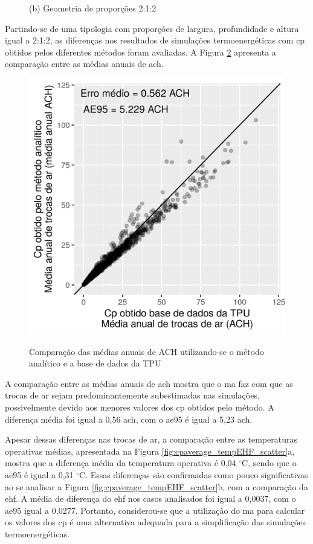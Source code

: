 \documentclass[brazil,hardcopy,openany]{ufscthesis} %
\begin{document}
\begin{figure}[h]
\begin{minipage}{.5\textwidth}
	\begin{center}
		\small{(b) Geometria de proporções 2:1:2}\\
		\phantom{}		
	\end{center}
	\end{minipage}
	\label{fig:cp_diff_scatter}
\end{figure}

Partindo-se de uma tipologia com proporções de largura, profundidade e altura igual a 2:1:2, as diferenças nos resultados de simulações termoenergéticas com \acrshort{cp} obtidos pelos diferentes métodos foram avaliadas. 
A Figura \ref{fig:cpaverage_ACH_scatter} apresenta a comparação entre as médias anuais de \acrfull{ach}. %

\begin{figure}[H]
	\centering
	\caption{Comparação das médias anuais de ACH utilizando-se o método analítico e a base de dados da TPU}
	\includegraphics[width=.5\linewidth]{img/cpaverage_ACH_scatter.png}
	\label{fig:cpaverage_ACH_scatter}
\end{figure}

A comparação entre as médias anuais de \acrshort{ach} mostra que o \acrlong{ma} faz com que as trocas de ar sejam predominantemente subestimadas nas simulações, possivelmente devido aos menores valores dos \acrshort{cp} obtidos pelo método.
A diferença média foi igual a 0,56 \acrshort{ach}, com o \acrfull{ae95} é igual a 5,23 \acrshort{ach}.

Apesar dessas diferenças nas trocas de ar, a comparação entre as temperaturas operativas médias, apresentada na Figura \ref{fig:cpaverage_tempEHF_scatter}a, mostra que a diferença média da temperatura operativa é 0,04 $^{\circ}$C, sendo que o \acrshort{ae95} é igual a 0,31 $^{\circ}$C.
Essas diferenças são confirmadas como pouco significativas ao se analisar a Figura \ref{fig:cpaverage_tempEHF_scatter}b, com a comparação da \acrfull{ehf}. A média de diferença do \acrshort{ehf} nos casos analisados foi igual a 0,0037, com o \acrshort{ae95} igual a 0,0277.
Portanto, considerou-se que a utilização do \acrlong{ma} para calcular os valores dos \acrshort{cp} é uma alternativa adequada para a simplificação das simulações termoenergéticas.
\end{document}
